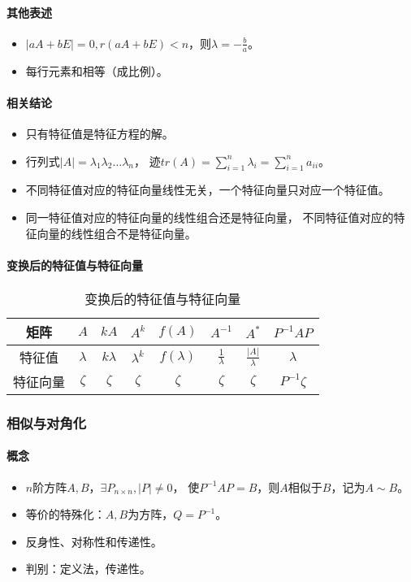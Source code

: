 \documentclass[
12pt, %
a4paper, 
oneside, %
headinclude,footinclude, %
]{scrartcl}
\begin{document}
\paragraph{其他表述}
\begin{itemize}
\item $ |aA + bE| = 0, r(aA + bE) < n $，则$ \lambda = -\frac{b}{a} $。
\item 每行元素和相等（成比例）。
\end{itemize}
\paragraph{相关结论}
\begin{itemize}
\item 只有特征值是特征方程的解。
\item 行列式$ |A| = \lambda_1 \lambda_2 \dots \lambda_n $，
迹$ tr(A) = \sum_{i = 1}^n \lambda_i = \sum_{i = 1}^n a_{ii} $。
\item 不同特征值对应的特征向量线性无关，一个特征向量只对应一个特征值。
\item 同一特征值对应的特征向量的线性组合还是特征向量，
不同特征值对应的特征向量的线性组合不是特征向量。
\end{itemize}
\paragraph{变换后的特征值与特征向量}
\begin{table}[hbt]
\caption{变换后的特征值与特征向量}
\centering
\begin{tabular}{cccccccc}
\hline
矩阵 & $ A $ & $ kA $ & $ A^k $ & $ f(A) $ & $ A^{-1} $ & $ A^* $ & $ P^{-1}AP $ \\
\hline
特征值 & $ \lambda $ & $ k\lambda $ & $ \lambda^k $ & $ f(\lambda) $ & $ \frac{1}{\lambda} $ & $ \frac{|A|}{\lambda} $ & $ \lambda $ \\
特征向量 & $ \zeta $ & $ \zeta $ & $ \zeta $ & $ \zeta $ & $ \zeta $ & $ \zeta $ & $ P^{-1}\zeta $ \\
\hline
\end{tabular}
\end{table} 
\subsubsection{相似与对角化}
\paragraph{概念}
\begin{itemize}
\item $ n $阶方阵$ A,B $，$ \exists P_{n \times n}, |P| \neq 0 $，
使$ P^{-1}AP = B $，则$ A $相似于$ B $，记为$ A \sim B $。
\item 等价的特殊化：$ A,B $为方阵，$ Q = P^{-1} $。
\item 反身性、对称性和传递性。
\item 判别：定义法，传递性。
\end{itemize}
\end{document}
